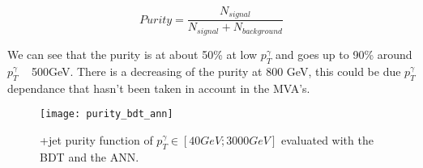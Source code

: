 \begin{equation}
Purity = \frac{N_{signal}}{N_{signal}+N_{background}}
\end{equation}

We can see that the purity is at about 50\% at low $p_T^\gamma$ and goes up to 90\% around $p_T^\gamma$ ~ 500GeV. There
is a decreasing of the purity at 800 GeV, this could be due $p_T^\gamma$ dependance that hasn't been taken in account in the MVA's.

\begin{figure}[h!]
\centering
    \texttt{[image: purity\_bdt\_ann]}
    \caption{\textgamma+jet purity function of $p_T^\gamma \in [ 40 GeV ; 3000 GeV ]$ evaluated with the BDT and the ANN.}
    \label{purity_bdt_ann}
\end{figure}

